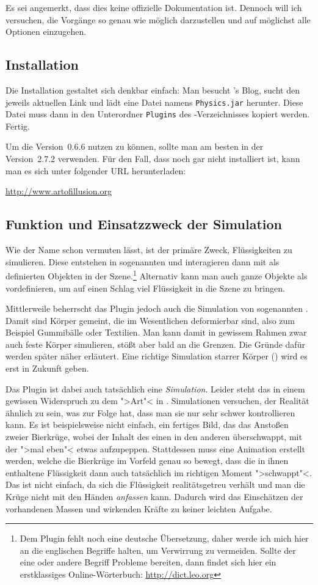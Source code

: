 \documentclass[10pt,DIV=14,a4paper]{scrartcl}
\begin{document}
Es sei angemerkt, dass dies keine offizielle Dokumentation ist. Dennoch
will ich versuchen, die Vorgänge so genau wie möglich darzustellen und
auf möglichst alle Optionen einzugehen.

\subsection{Installation}
Die Installation gestaltet sich denkbar einfach: Man besucht \deltor's
Blog, sucht den jeweils aktuellen Link und lädt eine Datei namens
\texttt{Physics.jar} herunter. Diese Datei muss dann in den Unterordner
\texttt{Plugins} des \aoi-Verzeichnisses kopiert werden. Fertig.

Um die Version~0.6.6 nutzen zu können, sollte man am besten \aoi
in der Version~2.7.2 verwenden. Für den Fall, dass \aoi noch gar nicht
installiert ist, kann man es sich unter folgender URL herunterladen:

\url{http://www.artofillusion.org}

\subsection{Funktion und Einsatzzweck der Simulation}
Wie der Name schon vermuten lässt, ist der primäre Zweck, Flüssigkeiten
zu simulieren. Diese entstehen in sogenannten  und
interagieren dann mit als  definierten Objekten in der
Szene.\footnote{Dem Plugin fehlt noch eine deutsche Übersetzung, daher
werde ich mich hier an die englischen Begriffe halten, um Verwirrung zu
vermeiden. Sollte der eine oder andere Begriff Probleme bereiten, dann
findet sich hier ein erstklassiges Online-Wörterbuch:
\url{http://dict.leo.org}} Alternativ kann man auch ganze Objekte
als  vordefinieren, um auf einen Schlag viel Flüssigkeit in die
Szene zu bringen.

Mittlerweile beherrscht das Plugin jedoch auch die Simulation von
sogenannten . Damit sind Körper gemeint, die im
Wesentlichen deformierbar sind, also zum Beispiel Gummibälle oder
Textilien. Man kann damit in gewissem Rahmen zwar auch feste Körper
simulieren, stößt aber bald an die Grenzen. Die Gründe dafür werden
später näher erläutert. Eine richtige Simulation starrer Körper
() wird es erst in Zukunft geben.

Das Plugin ist dabei auch tatsächlich eine \emph{Simulation}. Leider
steht das in einem gewissen Widerspruch zu dem ">Art"< in \aoi.
Simulationen versuchen, der Realität ähnlich zu sein, was zur Folge hat,
dass man sie nur sehr schwer kontrollieren kann. Es ist beispielsweise
nicht einfach, ein fertiges Bild, das das Anstoßen zweier Bierkrüge,
wobei der Inhalt des einen in den anderen überschwappt, mit der
\fluidsim ">mal eben"< etwas aufzupeppen. Stattdessen muss eine
Animation erstellt werden, welche die Bierkrüge im Vorfeld genau so
bewegt, dass die in ihnen enthaltene Flüssigkeit dann auch tatsächlich
im richtigen Moment ">schwappt"<.  Das ist nicht einfach, da sich die
Flüssigkeit realitätsgetreu verhält und man die Krüge nicht mit den
Händen \emph{anfassen} kann. Dadurch wird das Einschätzen der
vorhandenen Massen und wirkenden Kräfte zu keiner leichten Aufgabe.
\end{document}
